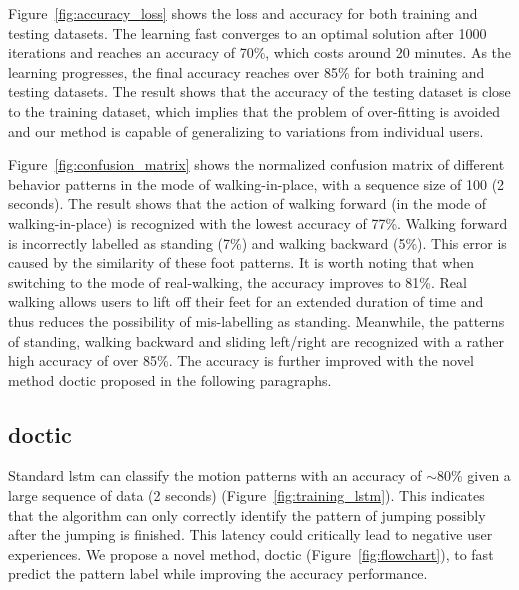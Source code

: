 \documentclass[review]{vgtc}                 %
\begin{document}
Figure~\ref{fig:accuracy_loss} shows the loss and accuracy for both training and testing datasets. 
The learning fast converges to an optimal solution after 1000 iterations and reaches an accuracy of 70\%, which costs around 20 minutes. 
As the learning progresses, the final accuracy reaches over 85\% for both training and testing datasets. 
The result shows that the accuracy of the testing dataset is close to the training dataset, which implies that the problem of over-fitting is avoided and our method is capable of generalizing to variations from individual users.


Figure~\ref{fig:confusion_matrix} shows the normalized confusion matrix of different behavior patterns in the mode of walking-in-place, with a sequence size of 100 (2 seconds). 
The result shows that the action of walking forward (in the mode of walking-in-place) is recognized with the lowest accuracy of 77\%.
Walking forward is incorrectly labelled as standing (7\%) and walking backward (5\%).  
This error is caused by the similarity of these foot patterns.
It is worth noting that when switching to the mode of real-walking, the accuracy improves to 81\%.
Real walking allows users to lift off their feet for an extended duration of time and thus reduces the possibility of mis-labelling as standing.
Meanwhile, the patterns of standing, walking backward and sliding left/right are recognized with a rather high accuracy of over 85\%.
The accuracy is further improved with the novel method \acs{doctic} proposed in the following paragraphs.



\subsection{\acl{doctic}}
Standard \acs{lstm} can classify the motion patterns with an accuracy of $\sim$80\% given a large sequence of data (2 seconds) (Figure~\ref{fig:training_lstm}). 
This indicates that the algorithm can only correctly identify the pattern of jumping possibly after the jumping is finished.
This latency could critically lead to negative user experiences.
We propose a novel method, \acf{doctic} (Figure~\ref{fig:flowchart}), to fast predict the pattern label while improving the accuracy performance.
\end{document}
